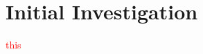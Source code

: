 \documentclass[11pt]{article}
\newcommand{\calcium}[0]{Ca\textsuperscript{2+}}
\newcommand{\todo}[1]{\textcolor{red}{#1}}
\begin{document}


\section{Initial Investigation}

\todo{this}


\printbibliography
\end{document}
